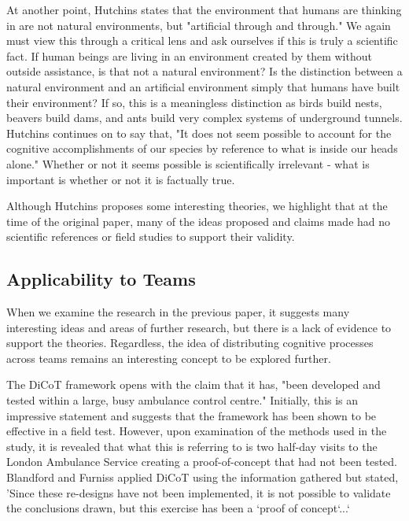 At another point, Hutchins states that the environment that humans are thinking in are not natural environments, but "artificial through and through."\cite{hutchins2000distributed} We again must view this through a critical lens and ask ourselves if this is truly a scientific fact. If human beings are living in an environment created by them without outside assistance, is that not a natural environment? Is the distinction between a natural environment and an artificial environment simply that humans have built their environment? If so, this is a meaningless distinction as birds build nests, beavers build dams, and ants build very complex systems of underground tunnels. Hutchins continues on to say that, "It does not seem possible to account for the cognitive accomplishments of our species by reference to what is inside our heads alone."\cite{hutchins2000distributed} Whether or not it seems possible is scientifically irrelevant - what is important is whether or not it is factually true.

Although Hutchins proposes some interesting theories, we highlight that at the time of the original paper, many of the ideas proposed and claims made had no scientific references or field studies to support their validity.

\subsection{Applicability to Teams}
When we examine the research in the previous paper, it suggests many interesting ideas and areas of further research, but there is a lack of evidence to support the theories. Regardless, the idea of distributing cognitive processes across teams remains an interesting concept to be explored further.

The DiCoT framework opens with the claim that it has, "been developed and tested within a large, busy ambulance control centre."\cite{blandford2005dicot} Initially, this is an impressive statement and suggests that the framework has been shown to be effective in a field test. However, upon examination of the methods used in the study, it is revealed that what this is referring to is two half-day visits to the London Ambulance Service creating a proof-of-concept that had not been tested. Blandford and Furniss applied DiCoT using the information gathered but stated, 'Since these re-designs have not been implemented, it is not possible to validate the conclusions drawn, but this exercise has been a `proof of concept`...`\cite{blandford2005dicot}

